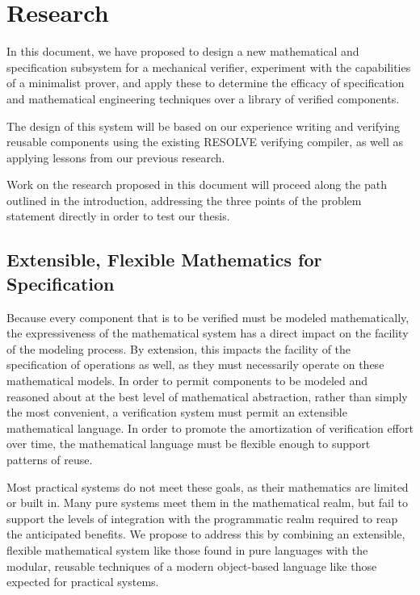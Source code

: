 \section{Research}\label{sec:research}
In this document, we have proposed to design a new mathematical and specification subsystem for a mechanical verifier, experiment with the capabilities of a minimalist prover, and apply these to determine the efficacy of specification and mathematical engineering techniques over a library of verified components.

The design of this system will be based on our experience writing and verifying reusable components using the existing RESOLVE verifying compiler, as well as applying lessons from our previous research.

Work on the research proposed in this document will proceed along the path outlined in the introduction, addressing the three points of the problem statement directly in order to test our thesis.

\subsection{Extensible, Flexible Mathematics for Specification}
Because every component that is to be verified must be modeled mathematically, the expressiveness of the mathematical system has a direct impact on the facility of the modeling process.  By extension, this impacts the facility of the specification of operations as well, as they must necessarily operate on these mathematical models.  In order to permit components to be modeled and reasoned about at the best level of mathematical abstraction, rather than simply the most convenient, a verification system must permit an extensible mathematical language.  In order to promote the amortization of verification effort over time, the mathematical language must be flexible enough to support patterns of reuse.

Most practical systems do not meet these goals, as their mathematics are limited or built in.  Many pure systems meet them in the mathematical realm, but fail to support the levels of integration with the programmatic realm required to reap the anticipated benefits.  We propose to address this by combining an extensible, flexible mathematical system like those found in pure languages with the modular, reusable techniques of a modern object-based language like those expected for practical systems.


